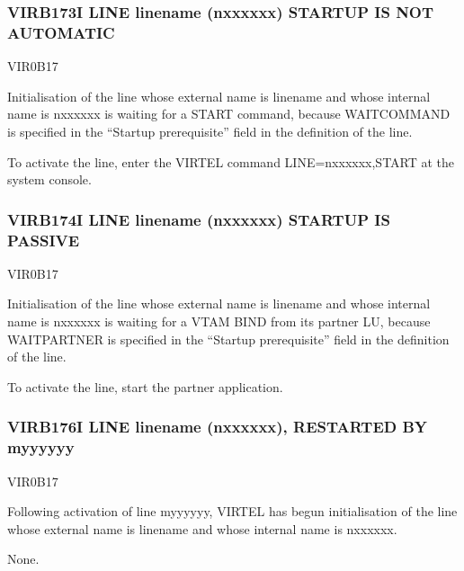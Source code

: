 \documentclass[letterpaper,10pt,english]{sphinxmanual}
\begin{document}
\subsubsection{VIRB173I LINE linename (n\sphinxhyphen{}xxxxxx) STARTUP IS NOT AUTOMATIC}
\label{\detokenize{messages:virb173i-line-linename-n-xxxxxx-startup-is-not-automatic}}\begin{description}
\sphinxAtStartPar
VIR0B17

\sphinxAtStartPar
Initialisation of the line whose external name is linename and whose internal name is n\sphinxhyphen{}xxxxxx is waiting for a START command, because WAIT\sphinxhyphen{}COMMAND is specified in the “Startup prerequisite” field in the definition of the line.

\sphinxAtStartPar
To activate the line, enter the VIRTEL command LINE=n\sphinxhyphen{}xxxxxx,START at the system console.

\end{description}


\subsubsection{VIRB174I LINE linename (n\sphinxhyphen{}xxxxxx) STARTUP IS PASSIVE}
\label{\detokenize{messages:virb174i-line-linename-n-xxxxxx-startup-is-passive}}\begin{description}
\sphinxAtStartPar
VIR0B17

\sphinxAtStartPar
Initialisation of the line whose external name is linename and whose internal name is n\sphinxhyphen{}xxxxxx is waiting for a VTAM BIND from its partner LU, because WAIT\sphinxhyphen{}PARTNER is specified in the “Startup prerequisite” field in the definition of the line.

\sphinxAtStartPar
To activate the line, start the partner application.

\end{description}


\subsubsection{VIRB176I LINE linename (n\sphinxhyphen{}xxxxxx), RESTARTED BY m\sphinxhyphen{}yyyyyy}
\label{\detokenize{messages:virb176i-line-linename-n-xxxxxx-restarted-by-m-yyyyyy}}\begin{description}
\sphinxAtStartPar
VIR0B17

\sphinxAtStartPar
Following activation of line m\sphinxhyphen{}yyyyyy, VIRTEL has begun initialisation of the line whose external name is linename and whose internal name is n\sphinxhyphen{}xxxxxx.

\sphinxAtStartPar
None.

\end{description}
\end{document}
